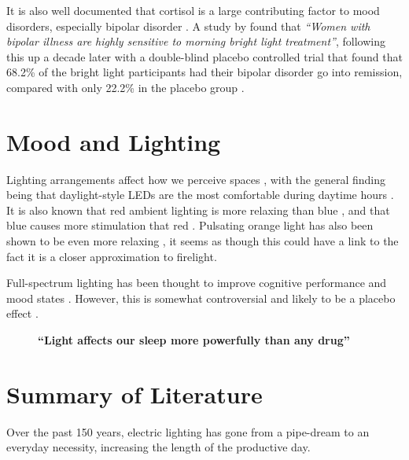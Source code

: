 It is also well documented that cortisol is a large contributing factor to mood disorders, especially bipolar disorder \citep{youngCortisolMoodDisorders2004}. A study by \citet{sitLightTherapyBipolar2007} found that \textit{``Women with bipolar illness are highly sensitive to morning bright light treatment''}, following this up a decade later with a double-blind placebo controlled trial that found that 68.2\% of the bright light participants had their bipolar disorder go into remission, compared with only 22.2\% in the placebo group \citep{sitAdjunctiveBrightLight2017}.

\section{Mood and Lighting}
\label{Sec:mood}

Lighting arrangements affect how we perceive spaces \citep{durakImpactLightingArrangements2007}, with the general finding being that daylight-style LEDs are the most comfortable during daytime hours \citep{cajochenEffectDaylightLED2019}. It is also known that red ambient lighting is more relaxing than blue \citep{lauferPsychophysiologicalEffectsColoured2009}, and that blue causes more stimulation that red \citep{schweitzerInvestigationGenderAgerelated2016}. Pulsating orange light has also been shown to be even more relaxing \citep{wanInfluenceLightingColor2012}, it seems as though this could have a link to the fact it is a closer approximation to firelight.

Full-spectrum lighting has been thought to improve cognitive performance and mood states \citep{berryWorkEfficiencyMood1984}. However, this is somewhat controversial and likely to be a placebo effect \citep{veitchDemandCharacteristicsFull1991}.

\begin{figure}[t]
\centering
\LARGE
\textbf{``Light affects our sleep more powerfully than any drug''}

\citep{czeislerPerspectiveCastingLight2013}
\end{figure}


\section{Summary of Literature}
\label{sec:LitSummary}

Over the past 150 years, electric lighting has gone from a pipe-dream to an everyday necessity, increasing the length of the productive day. 

